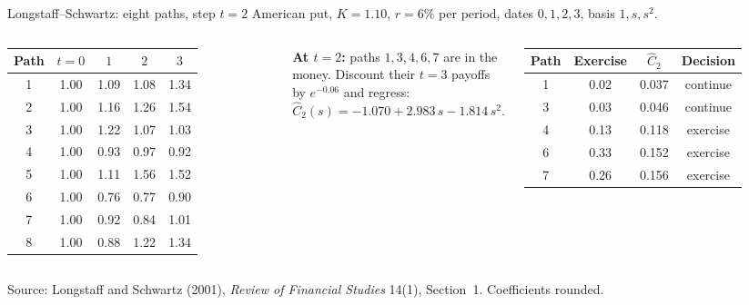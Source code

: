 \documentclass[handout,10pt,aspectratio=169]{beamer}
\begin{document}
\begin{frame}{Longstaff--Schwartz: eight paths, step \(t=2\)}
\small
American put, \(K=1.10\), \(r=6\%\) per period, dates \(0,1,2,3\), basis \(1,s,s^2\).
\begin{columns}[T,onlytextwidth]
\centering
\begin{tabular}{c|cccc}
\toprule
Path & \(t=0\) & \(1\) & \(2\) & \(3\)\\
\midrule
1 & 1.00 & 1.09 & 1.08 & 1.34\\
2 & 1.00 & 1.16 & 1.26 & 1.54\\
3 & 1.00 & 1.22 & 1.07 & 1.03\\
4 & 1.00 & 0.93 & 0.97 & 0.92\\
5 & 1.00 & 1.11 & 1.56 & 1.52\\
6 & 1.00 & 0.76 & 0.77 & 0.90\\
7 & 1.00 & 0.92 & 0.84 & 1.01\\
8 & 1.00 & 0.88 & 1.22 & 1.34\\
\bottomrule
\end{tabular}
\textbf{At \(t=2\):} paths \(1,3,4,6,7\) are in the money. Discount their
\(t=3\) payoffs by \(e^{-0.06}\) and regress:
\[
\widehat C_2(s)=-1.070+2.983\,s-1.814\,s^2.
\]
\centering
\begin{tabular}{c|ccc}
\toprule
Path & Exercise & \(\widehat C_2\) & Decision\\
\midrule
1 & 0.02 & 0.037 & continue\\
3 & 0.03 & 0.046 & continue\\
4 & 0.13 & 0.118 & exercise\\
6 & 0.33 & 0.152 & exercise\\
7 & 0.26 & 0.156 & exercise\\
\bottomrule
\end{tabular}
\end{columns}
\medskip
{\scriptsize Source: Longstaff and Schwartz (2001), \emph{Review of Financial
Studies} 14(1), Section~1. Coefficients rounded.\par}
\end{frame}
\end{document}
